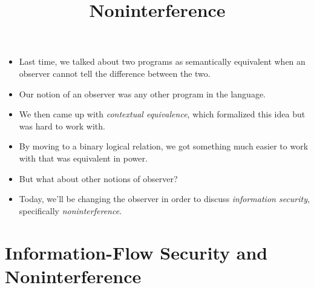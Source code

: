 \documentclass{lecturenotes}
\title{Noninterference}
\begin{document}
\maketitle

\begin{itemize}
\item Last time, we talked about two programs as semantically equivalent when an observer cannot tell the difference between the two.
\item Our notion of an observer was any other program in the language.
\item We then came up with \emph{contextual equivalence}, which formalized this idea but was hard to work with.
\item By moving to a binary logical relation, we got something much easier to work with that was equivalent in power.
\item But what about other notions of observer?
\item Today, we'll be changing the observer in order to discuss \emph{information security}, specifically \emph{noninterference}.
\end{itemize}

\section{Information-Flow Security and Noninterference}
\label{sec:inform-flow-secur}
\end{document}

